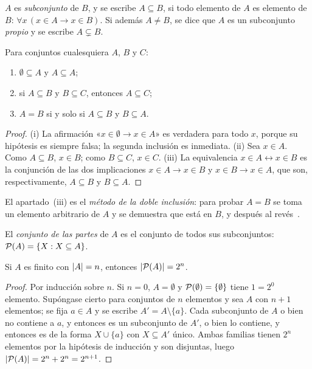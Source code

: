 \begin{definicion}[Subconjunto]
$A$ es \emph{subconjunto} de $B$, y se escribe $A\subseteq B$, si todo elemento de $A$ es elemento de $B$: $\forall x\,(x\in A\rightarrow x\in B)$. Si además $A\neq B$, se dice que $A$ es un subconjunto \emph{propio} y se escribe $A\subsetneq B$.
\end{definicion}

\begin{proposicion}\label{prop:t1-subconj}
Para conjuntos cualesquiera $A$, $B$ y $C$:
\begin{enumerate}
  \item $\emptyset\subseteq A$ y $A\subseteq A$;
  \item si $A\subseteq B$ y $B\subseteq C$, entonces $A\subseteq C$;
  \item $A=B$ si y solo si $A\subseteq B$ y $B\subseteq A$.
\end{enumerate}
\end{proposicion}

\begin{proof}
(i) La afirmación «$x\in\emptyset\rightarrow x\in A$» es verdadera para todo $x$, porque su hipótesis es siempre falsa; la segunda inclusión es inmediata. (ii) Sea $x\in A$. Como $A\subseteq B$, $x\in B$; como $B\subseteq C$, $x\in C$. (iii) La equivalencia $x\in A\leftrightarrow x\in B$ es la conjunción de las dos implicaciones $x\in A\rightarrow x\in B$ y $x\in B\rightarrow x\in A$, que son, respectivamente, $A\subseteq B$ y $B\subseteq A$.
\end{proof}

El apartado~(iii) es el \emph{método de la doble inclusión}: para probar $A=B$ se toma un elemento arbitrario de $A$ y se demuestra que está en $B$, y después al revés~\cite[§8.3]{hammack}.

\begin{definicion}
El \emph{conjunto de las partes} de $A$ es el conjunto de todos sus subconjuntos: $\mathcal{P}(A)=\{X : X\subseteq A\}$.
\end{definicion}

\begin{teorema}\label{teo:t1-partes}
Si $A$ es finito con $\lvert A\rvert=n$, entonces $\lvert\mathcal{P}(A)\rvert=2^{n}$.
\end{teorema}

\begin{proof}
Por inducción sobre $n$. Si $n=0$, $A=\emptyset$ y $\mathcal{P}(\emptyset)=\{\emptyset\}$ tiene $1=2^{0}$ elemento. Supóngase cierto para conjuntos de $n$ elementos y sea $A$ con $n+1$ elementos; se fija $a\in A$ y se escribe $A'=A\setminus\{a\}$. Cada subconjunto de $A$ o bien no contiene a $a$, y entonces es un subconjunto de $A'$, o bien lo contiene, y entonces es de la forma $X\cup\{a\}$ con $X\subseteq A'$ único. Ambas familias tienen $2^{n}$ elementos por la hipótesis de inducción y son disjuntas, luego $\lvert\mathcal{P}(A)\rvert=2^{n}+2^{n}=2^{n+1}$.
\end{proof}

